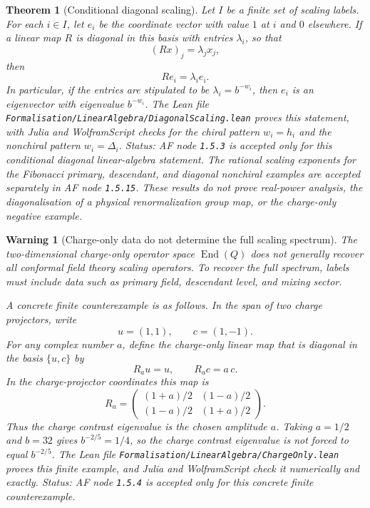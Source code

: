 \documentclass[11pt]{article}
\newtheorem{theorem}[definition]{Theorem}
\newtheorem{warning}[definition]{Warning}
\DeclareMathOperator{\End}{End}
\begin{document}
\begin{theorem}[Conditional diagonal scaling]
Let \(I\) be a finite set of scaling labels. For each \(i\in I\), let
\(e_i\) be the coordinate vector with value \(1\) at \(i\) and \(0\)
elsewhere. If a linear map \(R\) is diagonal in this basis with entries
\(\lambda_i\), so that
\[
(Rx)_j=\lambda_j x_j,
\]
then
\[
R e_i=\lambda_i e_i.
\]
In particular, if the entries are stipulated to be
\(\lambda_i=b^{-w_i}\), then \(e_i\) is an eigenvector with eigenvalue
\(b^{-w_i}\). The Lean file
\texttt{Formalisation/LinearAlgebra/DiagonalScaling.lean} proves this
statement, with Julia and WolframScript checks for the chiral pattern
\(w_i=h_i\) and the nonchiral pattern \(w_i=\Delta_i\). Status: AF node
\texttt{1.5.3} is accepted only for this conditional diagonal
linear-algebra statement. The rational scaling exponents for the Fibonacci
primary, descendant, and diagonal nonchiral examples are accepted separately
in AF node \texttt{1.5.15}. These results do not prove real-power analysis,
the diagonalisation of a physical renormalization group map, or the
charge-only negative example.
\end{theorem}

\begin{warning}[Charge-only data do not determine the full scaling spectrum]
The two-dimensional charge-only operator space \(\End(Q)\) does not generally
recover all conformal field theory scaling operators. To recover the full
spectrum, labels must include data such as primary field, descendant level,
and mixing sector.

A concrete finite counterexample is as follows. In the span of two charge
projectors, write
\[
u=(1,1),\qquad c=(1,-1).
\]
For any complex number \(a\), define the charge-only linear map that is
diagonal in the basis \(\{u,c\}\) by
\[
R_a u=u,\qquad R_a c=a\,c.
\]
In the charge-projector coordinates this map is
\[
R_a=
\begin{pmatrix}
(1+a)/2 & (1-a)/2\\
(1-a)/2 & (1+a)/2
\end{pmatrix}.
\]
Thus the charge contrast eigenvalue is the chosen amplitude \(a\). Taking
\(a=1/2\) and \(b=32\) gives \(b^{-2/5}=1/4\), so the charge contrast
eigenvalue is not forced to equal \(b^{-2/5}\). The Lean file
\texttt{Formalisation/LinearAlgebra/ChargeOnly.lean} proves this finite
example, and Julia and WolframScript check it numerically and exactly. Status:
AF node \texttt{1.5.4} is accepted only for this concrete finite
counterexample.
\end{warning}
\end{document}
